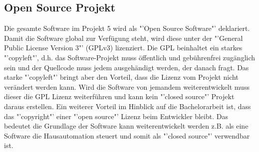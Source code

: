 \subsection{Open Source Projekt}\label{subsec:OSP}
Die gesamte Software im Projekt 5 wird als "'Open Source Software"' deklariert. Damit die Software global zur Verfügung steht, wird diese unter der "'General Public License Version 3"' (GPLv3) lizenziert. Die GPL beinhaltet ein starkes "'copyleft"', d.h. das Software-Projekt muss öffentlich und gebührenfrei zugänglich sein und der Quellcode muss jedem ausgehändigt werden, der danach fragt. Das starke "'copyleft"' bringt aber den Vorteil, dass die Lizenz vom Projekt nicht verändert werden kann. Wird die Software von jemandem weiterentwickelt muss dieser die GPL Lizenz weiterführen und kann kein "'closed source"' Projekt daraus erstellen. Ein weiterer Vorteil im Hinblick auf die Bachelorarbeit ist, dass das "'copyright"' einer "'open source"' Lizenz beim Entwickler bleibt. Das bedeutet die Grundlage der Software kann weiterentwickelt werden z.B. als eine Software die Hausautomation steuert und somit als "'closed source"' verwendbar ist.\cite{jaeger_was_2018}


